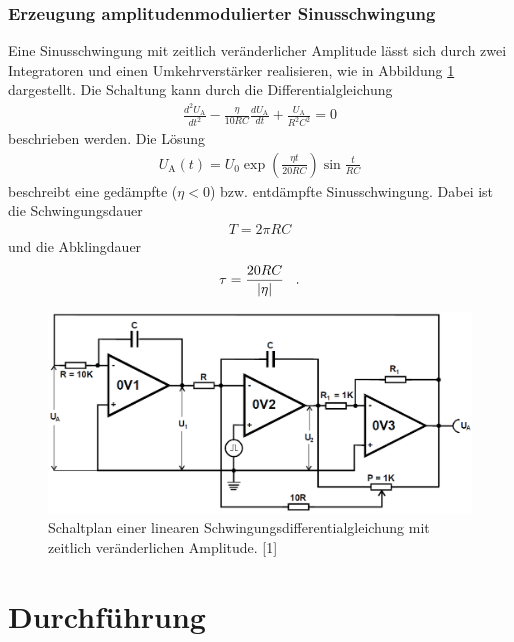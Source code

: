 \documentclass[]{scrartcl}
\let\oldsection\section
\renewcommand\section{\clearpage\oldsection}
\begin{document}
\subsubsection{Erzeugung amplitudenmodulierter Sinusschwingung}
Eine Sinusschwingung mit zeitlich veränderlicher Amplitude lässt sich durch zwei Integratoren und einen Umkehrverstärker realisieren, wie in Abbildung \ref{fig:schalplan_schwingung} dargestellt.
Die Schaltung kann durch die Differentialgleichung
\begin{align}
\frac{d^2 U_\text{A}}{dt^2}-\frac{\eta}{10 RC} \frac{d U_\text{A}}{dt}+\frac{U_\text{A}}{R^2C^2}=0
\end{align}
beschrieben werden. Die Lösung 
\begin{align}
U_\text{A}\left(t\right)=U_0\exp \left(\frac{\eta t}{20 RC}\right)\sin \frac{t}{RC}
\end{align}
beschreibt eine gedämpfte ($\eta < 0$) bzw. entdämpfte Sinusschwingung. Dabei ist die Schwingungsdauer
\begin{align}
T=2\pi RC
\label{eq:freqsin}
\end{align}
und die Abklingdauer
\begin{align}
\tau=\frac{20RC}{\left|\eta \right| }\hspace{0.3cm}\text{.}
\label{eq:key}
\end{align}
\begin{figure}[H]
\centering
\includegraphics[width=13cm]{images/schaltplan_schwingung.png}
\caption{Schaltplan einer linearen Schwingungsdifferentialgleichung mit zeitlich veränderlichen Amplitude. [1]}
\label{fig:schalplan_schwingung}
\end{figure}


\newpage

\section{Durchführung}
\end{document}
